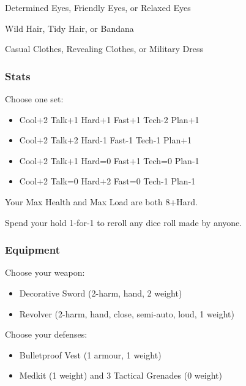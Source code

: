 Determined Eyes, Friendly Eyes, or Relaxed Eyes

Wild Hair, Tidy Hair, or Bandana

Casual Clothes, Revealing Clothes, or Military Dress

\subsubsection{Stats}
Choose one set:
\begin{itemize}
\setlength\itemsep{0em}
\item Cool+2 Talk+1 Hard+1 Fast+1 Tech-2 Plan+1
\item Cool+2 Talk+2 Hard-1 Fast-1 Tech-1 Plan+1
\item Cool+2 Talk+1 Hard=0 Fast+1 Tech=0 Plan-1
\item Cool+2 Talk=0 Hard+2 Fast=0 Tech-1 Plan-1
\end{itemize}

Your Max Health and Max Load are both 8+Hard.


           
Spend your hold 1-for-1 to reroll any dice roll made by anyone.

\subsubsection{Equipment}
Choose your weapon:
\begin{itemize}
\item Decorative Sword (2-harm, hand, 2 weight)
\item Revolver (2-harm, hand, close, semi-auto, loud, 1 weight)
\end{itemize}

Choose your defenses:
\begin{itemize}
\item Bulletproof Vest (1 armour, 1 weight)
\item Medkit (1 weight) and 3 Tactical Grenades (0 weight)
\end{itemize}

